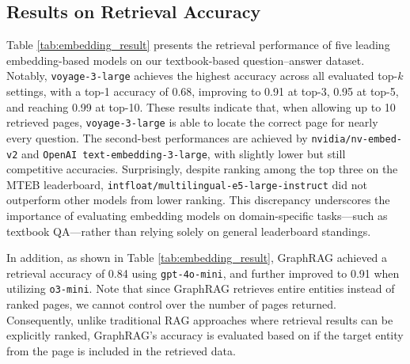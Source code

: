 \documentclass[runningheads]{llncs}
\begin{document}
\subsection{Results on Retrieval Accuracy}




Table \ref{tab:embedding_result} presents the retrieval performance of five leading embedding-based models on our textbook-based question--answer dataset. Notably, \texttt{voyage-3-large} achieves the highest accuracy across all evaluated top-$k$ settings, with a top-1 accuracy of 0.68, improving to 0.91 at top-3, 0.95 at top-5, and reaching 0.99 at top-10. These results indicate that, when allowing up to 10 retrieved pages, \texttt{voyage-3-large} is able to locate the correct page for nearly every question. The second-best performances are achieved by \texttt{nvidia/nv-embed-v2} and \texttt{OpenAI text-embedding-3-large}, with slightly lower but still competitive accuracies. Surprisingly, despite ranking among the top three on the MTEB leaderboard, \texttt{intfloat/multilingual-e5-large-instruct} did not outperform other models from lower ranking. This discrepancy underscores the importance of evaluating embedding models on domain-specific tasks—such as textbook QA—rather than relying solely on general leaderboard standings.

In addition, as shown in Table \ref{tab:embedding_result}, GraphRAG achieved a retrieval accuracy of 0.84 using \texttt{gpt-4o-mini}, and further improved to 0.91 when utilizing \texttt{o3-mini}. Note that since GraphRAG retrieves entire entities instead of ranked pages, we cannot control over the number of pages returned. Consequently, unlike traditional RAG approaches where retrieval results can be explicitly ranked, GraphRAG's accuracy is evaluated based on if the target entity from the page is included in the retrieved data.
\end{document}
